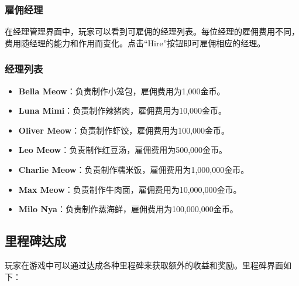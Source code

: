 \documentclass{mancls}%
\begin{document}
\subsubsection{雇佣经理}

在经理管理界面中，玩家可以看到可雇佣的经理列表。每位经理的雇佣费用不同，费用随经理的能力和作用而变化。点击“Hire”按钮即可雇佣相应的经理。

\subsubsection{经理列表}

\begin{itemize}
  \item \textbf{Bella Meow}：负责制作小笼包，雇佣费用为1,000金币。
  \item \textbf{Luna Mimi}：负责制作辣猪肉，雇佣费用为10,000金币。
  \item \textbf{Oliver Meow}：负责制作虾饺，雇佣费用为100,000金币。
  \item \textbf{Leo Meow}：负责制作红豆汤，雇佣费用为500,000金币。
  \item \textbf{Charlie Meow}：负责制作糯米饭，雇佣费用为1,000,000金币。
  \item \textbf{Max Meow}：负责制作牛肉面，雇佣费用为10,000,000金币。
  \item \textbf{Milo Nya}：负责制作蒸海鲜，雇佣费用为100,000,000金币。
\end{itemize}

\subsection{里程碑达成}

玩家在游戏中可以通过达成各种里程碑来获取额外的收益和奖励。里程碑界面如下：
\end{document}

